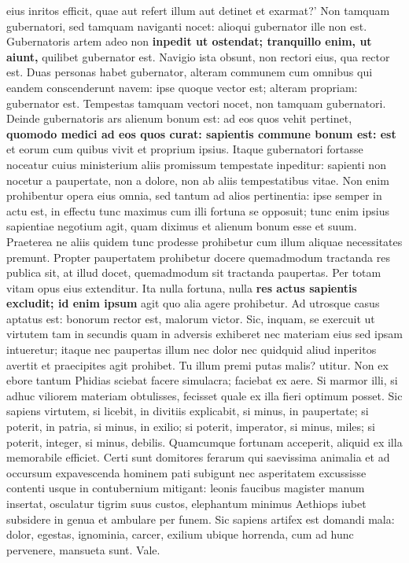 eius inritos efficit, quae aut refert illum aut detinet et exarmat?' Non tamquam gubernatori, sed tamquam naviganti nocet: alioqui gubernator ille non est. Gubernatoris artem adeo non \textbf{inpedit ut ostendat; tranquillo enim, ut aiunt,} quilibet gubernator est. Navigio ista obsunt, non rectori eius, qua rector est. Duas personas habet gubernator, alteram communem cum omnibus qui eandem conscenderunt navem: ipse quoque vector est; alteram propriam: gubernator est. Tempestas tamquam vectori nocet, non tamquam gubernatori. Deinde gubernatoris ars alienum bonum est: ad eos quos vehit pertinet, \textbf{quomodo medici ad eos \textbf{quos curat: sapientis} commune bonum est: est} et eorum cum quibus vivit et proprium ipsius. Itaque gubernatori fortasse noceatur cuius ministerium aliis promissum tempestate inpeditur: sapienti non nocetur a paupertate, non a dolore, non ab aliis tempestatibus vitae. Non enim prohibentur opera eius omnia, sed tantum ad alios pertinentia: ipse semper in actu est, in effectu tunc maximus cum illi fortuna se opposuit; tunc enim ipsius sapientiae negotium agit, quam diximus et alienum bonum esse et suum. Praeterea ne aliis quidem tunc prodesse prohibetur cum illum aliquae necessitates premunt. Propter paupertatem prohibetur docere quemadmodum tractanda res publica sit, at illud docet, quemadmodum sit tractanda paupertas. Per totam vitam opus eius extenditur. Ita nulla fortuna, nulla \textbf{res actus sapientis excludit; id enim ipsum} agit quo alia agere prohibetur. Ad utrosque casus aptatus est: bonorum rector est, malorum victor. Sic, inquam, se exercuit ut virtutem tam in secundis quam in adversis exhiberet nec materiam eius sed ipsam intueretur; itaque nec paupertas illum nec dolor nec quidquid aliud inperitos avertit et praecipites agit prohibet. Tu illum premi putas malis? utitur. Non ex ebore tantum Phidias sciebat facere simulacra; faciebat ex aere. Si marmor illi, si adhuc viliorem materiam obtulisses, fecisset quale ex illa fieri optimum posset. Sic sapiens virtutem, si licebit, in divitiis explicabit, si minus, in paupertate; si poterit, in patria, si minus, in exilio; si poterit, imperator, si minus, miles; si poterit, integer, si minus, debilis. Quamcumque fortunam acceperit, aliquid ex illa memorabile efficiet. Certi sunt domitores ferarum qui saevissima animalia et ad occursum expavescenda hominem pati subigunt nec asperitatem excussisse contenti usque in contubernium mitigant: leonis faucibus magister manum insertat, osculatur tigrim suus custos, elephantum minimus Aethiops iubet subsidere in genua et ambulare per funem. Sic sapiens artifex est domandi mala: dolor, egestas, ignominia, carcer, exilium ubique horrenda, cum ad hunc pervenere, mansueta sunt. Vale. 


